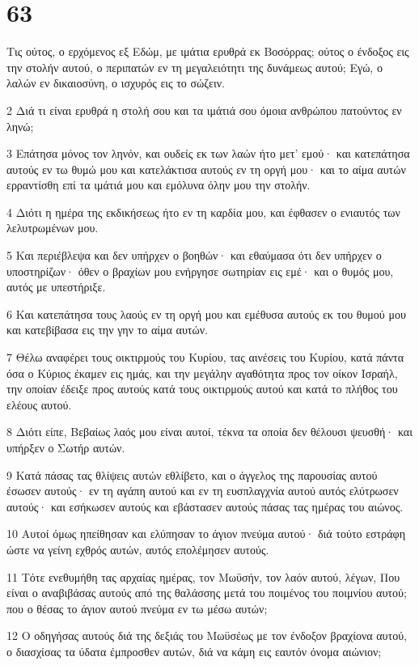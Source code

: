 \chapter{63}

\par Τις ούτος, ο ερχόμενος εξ Εδώμ, με ιμάτια ερυθρά εκ Βοσόρρας; ούτος ο ένδοξος εις την στολήν αυτού, ο περιπατών εν τη μεγαλειότητι της δυνάμεως αυτού; Εγώ, ο λαλών εν δικαιοσύνη, ο ισχυρός εις το σώζειν.
\par 2 Διά τι είναι ερυθρά η στολή σου και τα ιμάτιά σου όμοια ανθρώπου πατούντος εν ληνώ;
\par 3 Επάτησα μόνος τον ληνόν, και ουδείς εκ των λαών ήτο μετ' εμού· και κατεπάτησα αυτούς εν τω θυμώ μου και κατελάκτισα αυτούς εν τη οργή μου· και το αίμα αυτών ερραντίσθη επί τα ιμάτιά μου και εμόλυνα όλην μου την στολήν.
\par 4 Διότι η ημέρα της εκδικήσεως ήτο εν τη καρδία μου, και έφθασεν ο ενιαυτός των λελυτρωμένων μου.
\par 5 Και περιέβλεψα και δεν υπήρχεν ο βοηθών· και εθαύμασα ότι δεν υπήρχεν ο υποστηρίζων· όθεν ο βραχίων μου ενήργησε σωτηρίαν εις εμέ· και ο θυμός μου, αυτός με υπεστήριξε.
\par 6 Και κατεπάτησα τους λαούς εν τη οργή μου και εμέθυσα αυτούς εκ του θυμού μου και κατεβίβασα εις την γην το αίμα αυτών.
\par 7 Θέλω αναφέρει τους οικτιρμούς του Κυρίου, τας αινέσεις του Κυρίου, κατά πάντα όσα ο Κύριος έκαμεν εις ημάς, και την μεγάλην αγαθότητα προς τον οίκον Ισραήλ, την οποίαν έδειξε προς αυτούς κατά τους οικτιρμούς αυτού και κατά το πλήθος του ελέους αυτού.
\par 8 Διότι είπε, Βεβαίως λαός μου είναι αυτοί, τέκνα τα οποία δεν θέλουσι ψευσθή· και υπήρξεν ο Σωτήρ αυτών.
\par 9 Κατά πάσας τας θλίψεις αυτών εθλίβετο, και ο άγγελος της παρουσίας αυτού έσωσεν αυτούς· εν τη αγάπη αυτού και εν τη ευσπλαγχνία αυτού αυτός ελύτρωσεν αυτούς· και εσήκωσεν αυτούς και εβάστασεν αυτούς πάσας τας ημέρας του αιώνος.
\par 10 Αυτοί όμως ηπείθησαν και ελύπησαν το άγιον πνεύμα αυτού· διά τούτο εστράφη ώστε να γείνη εχθρός αυτών, αυτός επολέμησεν αυτούς.
\par 11 Τότε ενεθυμήθη τας αρχαίας ημέρας, τον Μωϋσήν, τον λαόν αυτού, λέγων, Που είναι ο αναβιβάσας αυτούς από της θαλάσσης μετά του ποιμένος του ποιμνίου αυτού; που ο θέσας το άγιον αυτού πνεύμα εν τω μέσω αυτών;
\par 12 Ο οδηγήσας αυτούς διά της δεξιάς του Μωϋσέως με τον ένδοξον βραχίονα αυτού, ο διασχίσας τα ύδατα έμπροσθεν αυτών, διά να κάμη εις εαυτόν όνομα αιώνιον;
